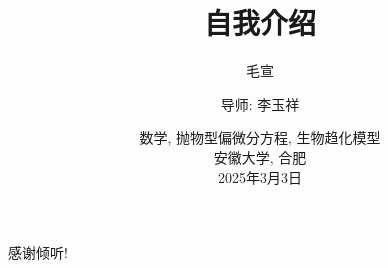 \documentclass[10pt]{beamer}
\title{自我介绍}
\author{毛宣\inst{1}\and
    导师: 李玉祥\inst{1}}
\institute{
    \inst{1}东南大学数学学院
    }
\date{数学, 抛物型偏微分方程, 生物趋化模型 \\
    安徽大学, 合肥\\
    2025年3月3日
    }
\theoremstyle{remark}
\begin{document}
\begin{frame}
\end{frame}








%


%

\begin{frame}[standout]
    感谢倾听!
\end{frame} 
\end{document}
